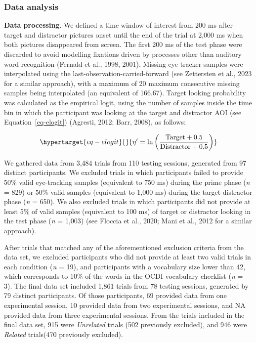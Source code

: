 \documentclass[
  12pt,
  b5paperpaper,
  twoside]{scrreprt}
\begin{document}
\hypertarget{data-analysis}{%
\subsubsection{Data analysis}\label{data-analysis}}

\textbf{Data processing}. We defined a time window of interest from 200
ms after target and distractor pictures onset until the end of the trial
at 2,000 ms when both pictures disappeared from screen. The first 200 ms
of the test phase were discarded to avoid modelling fixations driven by
processes other than auditory word recognition (Fernald et al., 1998,
2001). Missing eye-tracker samples were interpolated using the
last-observation-carried-forward (see Zettersten et al., 2023 for a
similar approach), with a maximum of 20 maximum consecutive missing
samples being interpolated (an equivalent of 166.67). Target looking
probability was calculated as the empirical logit, using the number of
samples inside the time bin in which the participant was looking at the
target and distractor AOI (see Equation~\ref{eq-elogit}) (Agresti, 2012;
Barr, 2008), as follows:

\begin{equation}\protect\hypertarget{eq-elogit}{}{
\eta' = \ln\bigg(\frac{\text{Target} + 0.5}{ \text{Distractor} + 0.5}\bigg)
}\label{eq-elogit}\end{equation}

We gathered data from 3,484 trials from 110 testing sessions, generated
from 97 distinct participants. We excluded trials in which participants
failed to provide 50\% valid eye-tracking samples (equivalent to 750 ms)
during the prime phase (\emph{n} = 829) or 50\% valid samples
(equivalent to 1,000 ms) during the target-distractor phase (\emph{n} =
650). We also excluded trials in which participants did not provide at
least 5\% of valid samples (equivalent to 100 ms) of target or
distractor looking in the test phase (\emph{n} = 1,003) (see Floccia et
al., 2020; Mani et al., 2012 for a similar approach).

After trials that matched any of the aforementioned exclusion criteria
from the data set, we excluded participants who did not provide at least
two valid trials in each condition (\emph{n} = 19), and participants
with a vocabulary size lower than 42, which corresponds to 10\% of the
words in the OCDI vocabulary checklist (\emph{n} = 3). The final data
set included 1,861 trials from 78 testing sessions, generated by 79
distinct participants. Of those participants, 69 provided data from one
experimental session, 10 provided data from two experimental sessions,
and NA provided data from three experimental sessions. From the trials
included in the final data set, 915 were \emph{Unrelated} trials (502
previously excluded), and 946 were \emph{Related} trials(470 previously
excluded).
\end{document}
